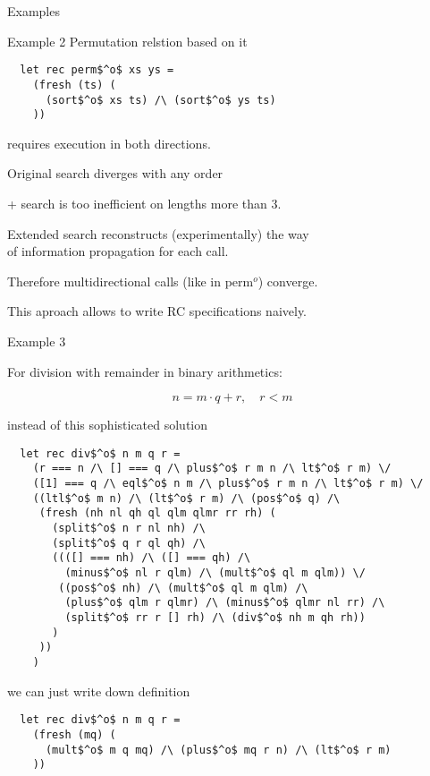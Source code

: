 \documentclass[final]{beamer}
\newlength{\onecolwid}
\begin{document}
\begin{frame}[fragile]
\begin{columns}[t]
\begin{column}{\onecolwid}
\begin{block}{Examples}
\begin{alertblock}{Example 2}
Permutation relstion based on it

\begin{lstlisting}
  let rec perm$^o$ xs ys =
    (fresh (ts) (
      (sort$^o$ xs ts) /\ (sort$^o$ ys ts)
    ))
\end{lstlisting}

requires execution in both directions.

\bigskip

Original search diverges with any order

+ search is too inefficient on lengths more than $3$.

\end{alertblock}

Extended search reconstructs (experimentally) the way \\ of information propagation for each call.

Therefore multidirectional calls (like in {\ttfamily perm$^o$}) converge.

\bigskip
\bigskip

This aproach allows to write RC specifications naively.

\begin{alertblock}{Example 3}

For division with remainder in binary arithmetics:

\[ n = m \cdot q + r, \quad r < m \]

instead of this sophisticated solution

\begin{lstlisting}
  let rec div$^o$ n m q r =
    (r === n /\ [] === q /\ plus$^o$ r m n /\ lt$^o$ r m) \/
    ([1] === q /\ eql$^o$ n m /\ plus$^o$ r m n /\ lt$^o$ r m) \/
    ((ltl$^o$ m n) /\ (lt$^o$ r m) /\ (pos$^o$ q) /\
     (fresh (nh nl qh ql qlm qlmr rr rh) (
       (split$^o$ n r nl nh) /\
       (split$^o$ q r ql qh) /\
       ((([] === nh) /\ ([] === qh) /\ 
         (minus$^o$ nl r qlm) /\ (mult$^o$ ql m qlm)) \/
        ((pos$^o$ nh) /\ (mult$^o$ ql m qlm) /\
         (plus$^o$ qlm r qlmr) /\ (minus$^o$ qlmr nl rr) /\
         (split$^o$ rr r [] rh) /\ (div$^o$ nh m qh rh))
       )
     ))
    )
\end{lstlisting}

we can just write down definition

\begin{lstlisting}
  let rec div$^o$ n m q r =
    (fresh (mq) (
      (mult$^o$ m q mq) /\ (plus$^o$ mq r n) /\ (lt$^o$ r m)
    ))
\end{lstlisting}


\end{alertblock}
\end{block}
\end{column}
\end{columns}
\end{frame}
\end{document}
